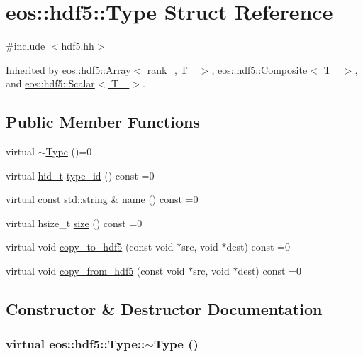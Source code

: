 \hypertarget{structeos_1_1hdf5_1_1Type}{
\section{eos::hdf5::Type Struct Reference}
\label{structeos_1_1hdf5_1_1Type}
}


{\ttfamily \#include $<$hdf5.hh$>$}

Inherited by \hyperlink{classeos_1_1hdf5_1_1Array}{eos::hdf5::Array$<$ rank\_\-, T\_\- $>$}, \hyperlink{classeos_1_1hdf5_1_1Composite}{eos::hdf5::Composite$<$ T\_\- $>$}, and \hyperlink{classeos_1_1hdf5_1_1Scalar}{eos::hdf5::Scalar$<$ T\_\- $>$}.\subsection*{Public Member Functions}
\begin{DoxyCompactItemize}
\item 
virtual \hyperlink{structeos_1_1hdf5_1_1Type_a0c9013a37b76efb7538829c3e14d0162}{$\sim$Type} ()=0
\item 
virtual \hyperlink{namespaceeos_1_1hdf5_a5bd5e209f1bf36cdc5551465dacf2e74}{hid\_\-t} \hyperlink{structeos_1_1hdf5_1_1Type_a0305c470a7a26a391f9a751e40bb9ff6}{type\_\-id} () const =0
\item 
virtual const std::string \& \hyperlink{structeos_1_1hdf5_1_1Type_a79de1c9f0444de59864107c388c23d2d}{name} () const =0
\item 
virtual hsize\_\-t \hyperlink{structeos_1_1hdf5_1_1Type_a0cf79b090412bb228a1df8349acf3c2b}{size} () const =0
\item 
virtual void \hyperlink{structeos_1_1hdf5_1_1Type_a30b665dc2adbe459feb640c61776b50a}{copy\_\-to\_\-hdf5} (const void $\ast$src, void $\ast$dest) const =0
\item 
virtual void \hyperlink{structeos_1_1hdf5_1_1Type_a4d1073336bce1500533e69a1187acd66}{copy\_\-from\_\-hdf5} (const void $\ast$src, void $\ast$dest) const =0
\end{DoxyCompactItemize}


\subsection{Constructor \& Destructor Documentation}
\hypertarget{structeos_1_1hdf5_1_1Type_a0c9013a37b76efb7538829c3e14d0162}{
\subsubsection[{$\sim$Type}]{\setlength{\rightskip}{0pt plus 5cm}virtual eos::hdf5::Type::$\sim$Type ()}}
\label{structeos_1_1hdf5_1_1Type_a0c9013a37b76efb7538829c3e14d0162}


